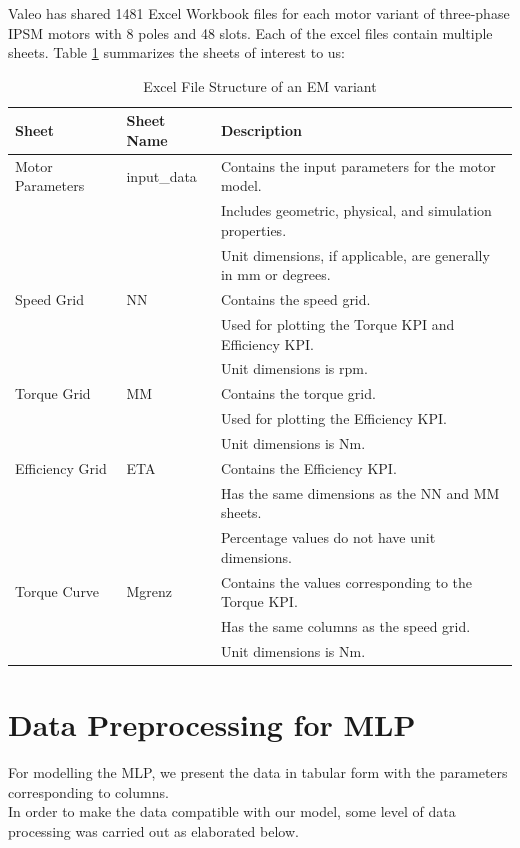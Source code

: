 \documentclass{report} %
\begin{document}
Valeo has shared 1481 Excel Workbook files for each motor variant of three-phase \ac{IPSM} motors with 8 poles and 48 slots. 
Each of the excel files contain multiple sheets.
Table \ref{tab:Excel File Structure} summarizes the sheets of interest to us:
\begin{table}[H]
    \centering
    \begin{tabular}{|p{3cm}|p{2.5cm}|p{10cm}|}
    \hline 
    {\bf Sheet} & {\bf Sheet Name} & {\bf Description} \\
    \hline 
    Motor Parameters & input\_data & 
    Contains the input parameters for the motor model. \\
    & & Includes geometric, physical, and simulation properties. \\
    & & Unit dimensions, if applicable, are generally in mm or degrees. \\
    Speed Grid & NN & 
    Contains the speed grid. \\
    & & Used for plotting the Torque \ac{KPI} and Efficiency \ac{KPI}. \\
    & & Unit dimensions is rpm. \\
    Torque Grid & MM & 
    Contains the torque grid. \\
    & & Used for plotting the Efficiency \ac{KPI}. \\
    & & Unit dimensions is Nm. \\
    Efficiency Grid & ETA & 
    Contains the Efficiency \ac{KPI}. \\
    & & Has the same dimensions as the NN and MM sheets. \\
    & & Percentage values do not have unit dimensions. \\
    Torque Curve & Mgrenz & 
    Contains the values corresponding to the Torque \ac{KPI}. \\
    & & Has the same columns as the speed grid. \\
    & & Unit dimensions is Nm. \\
    \hline 
    \end{tabular}
    \caption{Excel File Structure of an \ac{EM} variant}
    \label{tab:Excel File Structure}
\end{table}

\section{Data Preprocessing for \ac{MLP}}\label{sec:Data Preprocessing for MLP}

For modelling the \ac{MLP}, we present the data in tabular form with the parameters corresponding to columns. \\
In order to make the data compatible with our model, some level of data processing was carried out as elaborated below.
\end{document}
